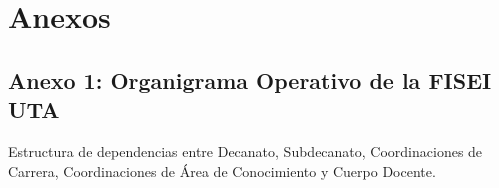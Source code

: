 \documentclass[12pt,a4paper]{article}
\begin{document}
\vspace{0.4cm}

\section{Anexos}
\subsection*{Anexo 1: Organigrama Operativo de la FISEI UTA}
Estructura de dependencias entre Decanato, Subdecanato, Coordinaciones de Carrera, Coordinaciones de Área de Conocimiento y Cuerpo Docente.
\end{document}
